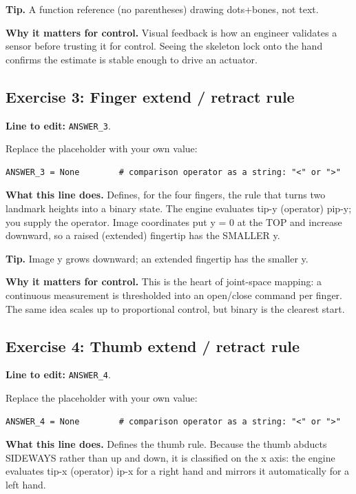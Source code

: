 \documentclass[conference]{IEEEtran}
\begin{document}
\textbf{Tip.} A function reference (no parentheses) drawing dots+bones, not text.

\textbf{Why it matters for control.} Visual feedback is how an engineer validates a sensor before trusting it for control. Seeing the skeleton lock onto the hand confirms the estimate is stable enough to drive an actuator.

\subsection{Exercise 3: Finger extend / retract rule}

\textbf{Line to edit:} \lstinline!ANSWER_3!.

Replace the placeholder with your own value:

\begin{lstlisting}
ANSWER_3 = None        # comparison operator as a string: "<" or ">"
\end{lstlisting}


\textbf{What this line does.} Defines, for the four fingers, the rule that turns two landmark heights into a binary state. The engine evaluates tip-y (operator) pip-y; you supply the operator. Image coordinates put y = 0 at the TOP and increase downward, so a raised (extended) fingertip has the SMALLER y.

\textbf{Tip.} Image y grows downward; an extended fingertip has the smaller y.

\textbf{Why it matters for control.} This is the heart of joint-space mapping: a continuous measurement is thresholded into an open/close command per finger. The same idea scales up to proportional control, but binary is the clearest start.

\subsection{Exercise 4: Thumb extend / retract rule}

\textbf{Line to edit:} \lstinline!ANSWER_4!.

Replace the placeholder with your own value:

\begin{lstlisting}
ANSWER_4 = None        # comparison operator as a string: "<" or ">"
\end{lstlisting}


\textbf{What this line does.} Defines the thumb rule. Because the thumb abducts SIDEWAYS rather than up and down, it is classified on the x axis: the engine evaluates tip-x (operator) ip-x for a right hand and mirrors it automatically for a left hand.
\end{document}
